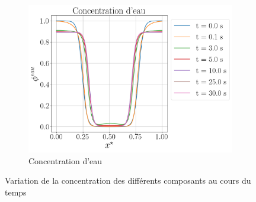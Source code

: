 \begin{figure}[H]
	\centering
	\ContinuedFloat
	\begin{subfigure}[H]{0.45\textwidth}
		\centering
		\includegraphics[width=1.1\textwidth]{figure/nouveau_parametrage/eau_New_Parametrage.png}
		\caption{Concentration d'eau}
	\end{subfigure}
	\caption{Variation de la concentration des différents composants au cours du temps}
	\label{fig:resultstatiquegoodlandscape}
\end{figure}
%

